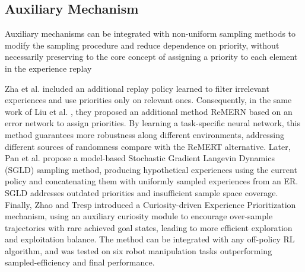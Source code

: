 
\subsection{Auxiliary Mechanism}

Auxiliary mechanisms can be integrated with non-uniform sampling methods to modify the sampling procedure and reduce dependence on priority, without necessarily preserving to the core concept of assigning a priority to each element in the experience replay

Zha et al. \cite{zha2019experience} included an additional replay policy learned to filter irrelevant experiences and use priorities only on relevant ones. Consequently, in the same work of Liu et al. \cite{liu2021regret}, they proposed an additional method ReMERN based on an error network to assign priorities. By learning a task-specific neural network, this method guarantees more robustness along different environments, addressing different sources of randomness compare with the ReMERT alternative. Later, Pan et al. \cite{pan2022understanding} propose a model-based Stochastic Gradient Langevin Dynamics (SGLD) sampling method, producing hypothetical experiences using the current policy and concatenating them with uniformly sampled experiences from an ER. SGLD addresses outdated priorities and insufficient sample space coverage. Finally, Zhao and Tresp \cite{zhao2019curiosity} introduced a Curiosity-driven Experience Prioritization mechanism, using an auxiliary curiosity module to encourage over-sample trajectories with rare achieved goal states, leading to more efficient exploration and exploitation balance. The method can be integrated with any off-policy RL algorithm, and was tested on six robot manipulation tasks outperforming sampled-efficiency and final performance.



